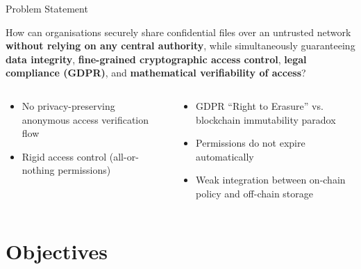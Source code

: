 \documentclass[aspectratio=169]{beamer}
\begin{document}
\begin{frame}{Problem Statement}
\begin{tcolorbox}[redbox, title={\textbf{Problem Statement}}]
\small
How can organisations securely share confidential files over an untrusted network
\textbf{without relying on any central authority}, while simultaneously guaranteeing
\textbf{data integrity}, \textbf{fine-grained cryptographic access control},
\textbf{legal compliance (GDPR)}, and \textbf{mathematical verifiability of access}?
\end{tcolorbox}
\vspace{0.2cm}
\begin{columns}[t]
\begin{tcolorbox}[bluebox, title=\textbf{What Existing Solutions Miss}]
\small
\begin{itemize}
  \item No privacy-preserving anonymous access verification flow
  \item Rigid access control (all-or-nothing permissions)
\end{itemize}
\end{tcolorbox}
\begin{tcolorbox}[greenbox, title=\textbf{What Existing Solutions Miss}]
\small
\begin{itemize}
  \item GDPR ``Right to Erasure'' vs. blockchain immutability paradox
  \item Permissions do not expire automatically
  \item Weak integration between on-chain policy and off-chain storage
\end{itemize}
\end{tcolorbox}
\end{columns}
\end{frame}

\section{Objectives}
\end{document}
